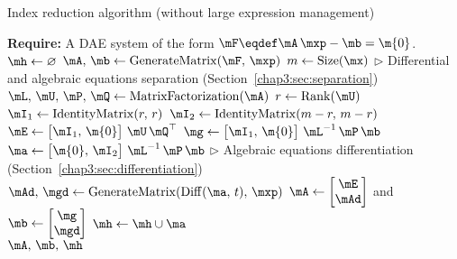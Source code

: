 \begin{breakablealgorithm}
  \caption{Index reduction algorithm (without large expression management)~\cite{stocco2024symbolic}}
  \label{chap3:alg:index_reduction}
  \begin{algorithmic}[1]
    \State \textbf{Require:} A \ac{DAE} system of the form $\mF \eqdef \mA \, \mxp - \mb = \m{0}$.
     
      \State $\mh \gets \varnothing$ 
      \State $\mA, \, \mb \gets \mathrm{GenerateMatrix}(\mF, \, \mxp)$ 
      \State $m \gets \mathrm{Size}(\mx)$
        \State $\displaystyle\triangleright$ Differential and algebraic equations separation (Section~\ref{chap3:sec:separation})
        \State $\mL, \, \mU, \, \mP, \, \mQ \gets \mathrm{MatrixFactorization}(\mA)$ 
        \State $r \gets \mathrm{Rank}(\mU)$ 
        \State $\mI_1 \gets \mathrm{IdentityMatrix}(r, \, r)$ 
        \State $\mI_2 \gets \mathrm{IdentityMatrix}(m-r, \, m-r)$ 
        \State $\mE \gets \begin{bmatrix} \mI_1, \, \m{0} \end{bmatrix} \, \mU \, \mQ^\top$ 
        \State $\mg \gets \begin{bmatrix} \mI_1, \, \m{0} \end{bmatrix} \, \mL^{-1} \, \mP \, \mb$ 
        \State $\ma \gets \begin{bmatrix} \m{0}, \, \mI_2 \end{bmatrix} \, \mL^{-1} \, \mP \, \mb$ 
        \State $\displaystyle\triangleright$ Algebraic equations differentiation (Section~\ref{chap3:sec:differentiation})
        \State $\mAd, \, \mgd \gets \mathrm{GenerateMatrix}(\mathrm{Diff}(\ma, \, t), \, \mxp)$ 
        \State $\mA \gets \begin{bmatrix} \mE \\ \mAd \end{bmatrix}$ and $\mb \gets \begin{bmatrix} \mg \\ \mgd \end{bmatrix}$
        \State $\mh \gets \mh \cup \ma$ 
      \EndWhile \\
      \Return $\mA, \, \mb, \, \mh$ 
    \EndProcedure
  \end{algorithmic}
\end{breakablealgorithm}

